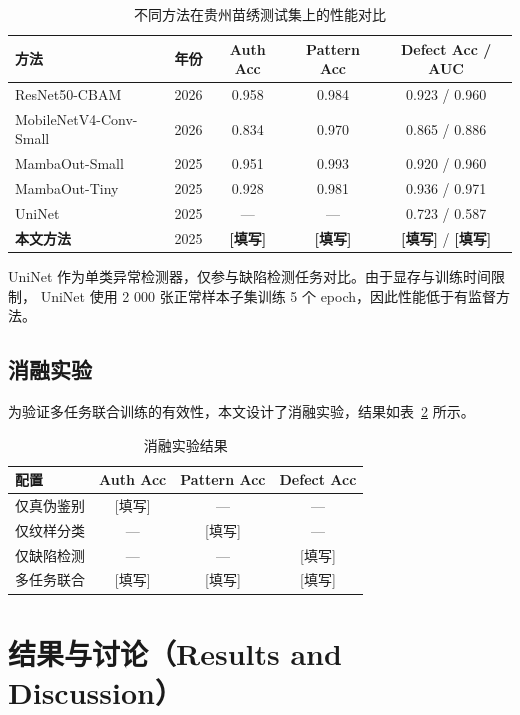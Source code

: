 \documentclass[12pt,a4paper]{article}
\begin{document}
\begin{table}[htbp]
\centering
\caption{不同方法在贵州苗绣测试集上的性能对比}
\label{tab:comparison}
\begin{tabular}{lcccc}
\toprule
方法 & 年份 & Auth Acc & Pattern Acc & Defect Acc / AUC \\
\midrule
ResNet50-CBAM & 2026 & 0.958 & 0.984 & 0.923 / 0.960 \\
MobileNetV4-Conv-Small & 2026 & 0.834 & 0.970 & 0.865 / 0.886 \\
MambaOut-Small & 2025 & 0.951 & 0.993 & 0.920 / 0.960 \\
MambaOut-Tiny & 2025 & 0.928 & 0.981 & 0.936 / 0.971 \\
UniNet & 2025 & --- & --- & 0.723 / 0.587 \\
\midrule
\textbf{本文方法} & 2025 & \textbf{[填写]} & \textbf{[填写]} & \textbf{[填写]} / \textbf{[填写]} \\
\bottomrule
\end{tabular}
\end{table}

UniNet 作为单类异常检测器，仅参与缺陷检测任务对比。由于显存与训练时间限制，
UniNet 使用 2 000 张正常样本子集训练 5 个 epoch，因此性能低于有监督方法。

\subsection{消融实验}
为验证多任务联合训练的有效性，本文设计了消融实验，结果如表~\ref{tab:ablation} 所示。

\begin{table}[htbp]
\centering
\caption{消融实验结果}
\label{tab:ablation}
\begin{tabular}{lccc}
\toprule
配置 & Auth Acc & Pattern Acc & Defect Acc \\
\midrule
仅真伪鉴别 & [填写] & --- & --- \\
仅纹样分类 & --- & [填写] & --- \\
仅缺陷检测 & --- & --- & [填写] \\
多任务联合 & [填写] & [填写] & [填写] \\
\bottomrule
\end{tabular}
\end{table}

\section{结果与讨论（Results and Discussion）}
\end{document}
